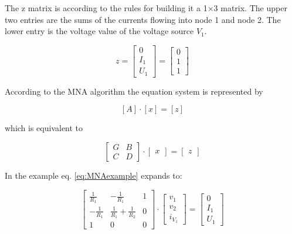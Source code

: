 The z matrix is according to the rules for building it a 1$\times$3
matrix.  The upper two entries are the sums of the currents flowing
into node 1 and node 2.  The lower entry is the voltage value of the
voltage source $V_{1}$.

\begin{equation}
z =
\begin{bmatrix}
0\\
I_{1}\\
U_{1}
\end{bmatrix}
=
\begin{bmatrix}
0\\
1\\
1
\end{bmatrix}
\end{equation}

According to the MNA algorithm the equation system is represented by

\begin{equation}
\left[A\right] \cdot \left[x\right] = \left[z\right]
\end{equation}

which is equivalent to

\begin{equation}
\begin{bmatrix}
G & B\\
C & D
\end{bmatrix}
\cdot
\begin{bmatrix}
x
\end{bmatrix}
=
\begin{bmatrix}
z
\end{bmatrix}
\label{eq:MNAexample}
\end{equation}

In the example eq. \eqref{eq:MNAexample} expands to:

\begin{equation}
\begin{bmatrix}
\frac{1}{R_{1}} & -\frac{1}{R_{1}} & 1\\
-\frac{1}{R_{1}} & \frac{1}{R_{1}} + \frac{1}{R_{2}} & 0\\
1 & 0 & 0
\end{bmatrix}
\cdot
\begin{bmatrix}
v_{1}\\
v_{2}\\
i_{V_{1}}
\end{bmatrix}
=
\begin{bmatrix}
0\\
I_{1}\\
U_{1}
\end{bmatrix}
\label{eq:MNAfull}
\end{equation}


